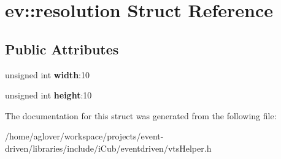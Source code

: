 \hypertarget{structev_1_1resolution}{}\section{ev\+:\+:resolution Struct Reference}
\label{structev_1_1resolution}
\subsection*{Public Attributes}
\begin{DoxyCompactItemize}
\item 
unsigned int {\bfseries width}\+:10\hypertarget{structev_1_1resolution_af63d9f023bf48b5170fbde6fac1fa60d}{}\label{structev_1_1resolution_af63d9f023bf48b5170fbde6fac1fa60d}

\item 
unsigned int {\bfseries height}\+:10\hypertarget{structev_1_1resolution_ae9919e691ce05e1bbbf281dd79102ddb}{}\label{structev_1_1resolution_ae9919e691ce05e1bbbf281dd79102ddb}

\end{DoxyCompactItemize}


The documentation for this struct was generated from the following file\+:\begin{DoxyCompactItemize}
\item 
/home/aglover/workspace/projects/event-\/driven/libraries/include/i\+Cub/eventdriven/vts\+Helper.\+h\end{DoxyCompactItemize}
